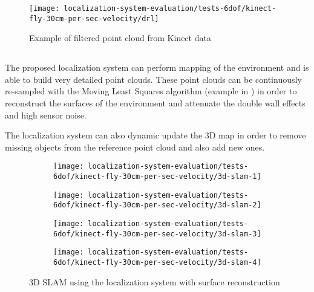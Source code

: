 \begin{figure}[H]
	\centering
	\texttt{[image: localization-system-evaluation/tests-6dof/kinect-fly-30cm-per-sec-velocity/drl]}
	\caption{Example of filtered point cloud from Kinect data}
	\label{fig:localization-system-evaluation_kinect-fly-30cm-per-sec-velocity-drl-filters}
\end{figure}


\subsection{}

The proposed localization system can perform mapping of the environment and is able to build very detailed point clouds. These point clouds can be continuously re-sampled with the Moving Least Squares algorithm (example in ) in order to reconstruct the surfaces of the environment and attenuate the double wall effects and high sensor noise.

The localization system can also dynamic update the 3D map in order to remove missing objects from the reference point cloud and also add new ones.


\begin{figure}[H]
	\centering
	\begin{subfigure}[ht]{0.45\textwidth}
		\centering
		\texttt{[image: localization-system-evaluation/tests-6dof/kinect-fly-30cm-per-sec-velocity/3d-slam-1]}
	\end{subfigure}
	\begin{subfigure}[ht]{0.45\textwidth}
		\centering
		\texttt{[image: localization-system-evaluation/tests-6dof/kinect-fly-30cm-per-sec-velocity/3d-slam-2]}
	\end{subfigure}
	\begin{subfigure}[ht]{0.45\textwidth}
		\centering
		\texttt{[image: localization-system-evaluation/tests-6dof/kinect-fly-30cm-per-sec-velocity/3d-slam-3]}
	\end{subfigure}
	\begin{subfigure}[ht]{0.45\textwidth}
		\centering
		\texttt{[image: localization-system-evaluation/tests-6dof/kinect-fly-30cm-per-sec-velocity/3d-slam-4]}
	\end{subfigure}
	\caption{3D SLAM using the localization system with surface reconstruction}
	\label{fig:localization-system-evaluation_kinect-fly-30cm-per-sec-velocity-drl-slam}
\end{figure}

